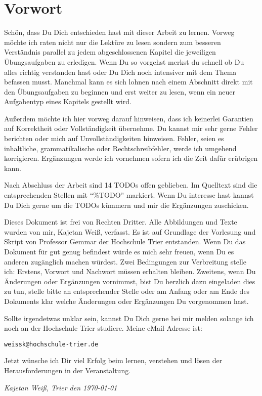 \chapter*{Vorwort}
Schön, dass Du Dich entschieden hast mit dieser Arbeit zu lernen. Vorweg möchte ich raten nicht nur die Lektüre zu lesen sondern zum besseren Verständnis parallel zu jedem abgeschlossenen Kapitel die jeweiligen Übungsaufgaben zu erledigen. Wenn Du so vorgehst merkst du schnell ob Du alles richtig verstanden hast oder Du Dich noch intensiver mit dem Thema befassen musst. Manchmal kann es sich lohnen nach einem Abschnitt direkt mit den Übungsaufgaben zu beginnen und erst weiter zu lesen, wenn ein neuer Aufgabentyp eines Kapitels gestellt wird.

Außerdem möchte ich hier vorweg darauf hinweisen, dass ich keinerlei Garantien auf Korrektheit oder Vollständigkeit übernehme. Du kannst mir sehr gerne Fehler berichten oder mich auf Unvollständigkeiten hinweisen. Fehler, seien es inhaltliche, grammatikalische oder Rechtschreibfehler, werde ich umgehend korrigieren. Ergänzungen werde ich vornehmen sofern ich die Zeit dafür erübrigen kann.

Nach Abschluss der Arbeit sind 14 TODOs offen geblieben. Im Quelltext sind die entsprechenden Stellen mit "`\%TODO"' markiert. Wenn Du interesse hast kannst Du Dich gerne um die TODOs kümmern und mir die Ergänzungen zuschicken.

Dieses Dokument ist frei von Rechten Dritter. Alle Abbildungen und Texte wurden von mir, Kajetan Weiß, verfasst. Es ist auf Grundlage der Vorlesung und Skript von Professor Gemmar der Hochschule Trier entstanden. Wenn Du das Dokument für gut genug befindest würde es mich sehr freuen, wenn Du es anderen zugänglich machen würdest. Zwei Bedingungen zur Verbreitung stelle ich: Erstens, Vorwort und Nachwort müssen erhalten bleiben. Zweitens, wenn Du Änderungen oder Ergänzungen vornimmst, bist Du herzlich dazu eingeladen dies zu tun, stelle bitte an entsprechender Stelle oder am Anfang oder am Ende des Dokuments klar welche Änderungen oder Ergänzungen Du vorgenommen hast.

Sollte irgendetwas unklar sein, kannst Du Dich gerne bei mir melden solange ich noch an der Hochschule Trier studiere. Meine eMail-Adresse ist:
\begin{center}
	\texttt{weissk@hochschule-trier.de}
\end{center}

Jetzt wünsche ich Dir viel Erfolg beim lernen, verstehen und lösen der Herausforderungen in der Veranstaltung.

\vspace{2cm}

\textsl{Kajetan Weiß, Trier den \today}